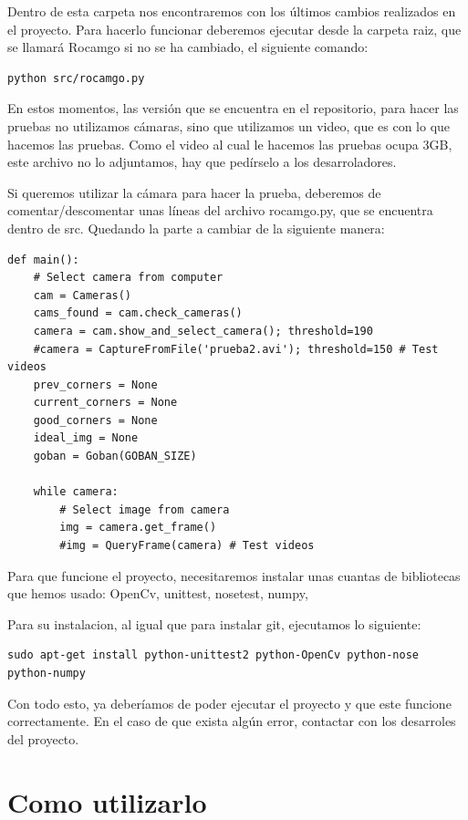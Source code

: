 \documentclass[12pt,a4paper]{report}
\begin{document}
Dentro de esta carpeta nos encontraremos con los últimos cambios realizados en
el proyecto. Para hacerlo funcionar deberemos ejecutar desde la carpeta raiz,
que se llamará Rocamgo si no se ha cambiado, el siguiente comando:

\begin{verbatim}
python src/rocamgo.py
\end{verbatim}

En estos momentos, las versión que se encuentra en el repositorio, para hacer
las pruebas no utilizamos cámaras, sino que utilizamos un video, que es con lo
que hacemos las pruebas. Como el video al cual le hacemos las pruebas ocupa 3GB,
este archivo no lo adjuntamos, hay que pedírselo a los desarroladores. 

Si queremos utilizar la cámara para hacer la prueba, deberemos de
comentar/descomentar unas líneas del archivo rocamgo.py, que se encuentra dentro
de src. Quedando la parte a cambiar de la siguiente manera: 

\begin{verbatim}
def main():
    # Select camera from computer
    cam = Cameras()
    cams_found = cam.check_cameras()
    camera = cam.show_and_select_camera(); threshold=190
    #camera = CaptureFromFile('prueba2.avi'); threshold=150 # Test videos
    prev_corners = None
    current_corners = None
    good_corners = None
    ideal_img = None
    goban = Goban(GOBAN_SIZE)

    while camera: 
        # Select image from camera 
        img = camera.get_frame()
        #img = QueryFrame(camera) # Test videos
\end{verbatim}

Para que funcione el proyecto, necesitaremos instalar unas cuantas de bibliotecas
que hemos usado: OpenCv, unittest, nosetest, numpy, 

Para su instalacion, al igual que para instalar git, ejecutamos lo siguiente:

\begin{verbatim}
sudo apt-get install python-unittest2 python-OpenCv python-nose python-numpy
\end{verbatim}

Con todo esto, ya deberíamos de poder ejecutar el proyecto y que este funcione
correctamente. En el caso de que exista algún error, contactar con los
desarroles del proyecto. 


\section{Como utilizarlo}
\end{document}
